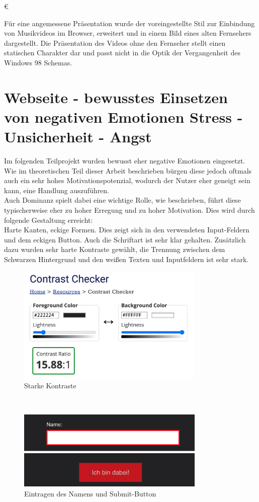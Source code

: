 €\documentclass[./dokumentation.tex]{subfiles}
\begin{document}
Für eine angemessene Präsentation wurde der voreingestellte Stil zur Einbindung von Musikvideos im Browser, erweitert und in einem Bild eines alten Fernsehers dargestellt. Die Präsentation des Videos ohne den Fernseher stellt einen statischen Charakter dar und passt nicht in die Optik der Vergangenheit des Windows 98 Schemas.


\pagebreak
\section{Webseite - bewusstes Einsetzen von negativen Emotionen Stress - Unsicherheit - Angst}
Im folgenden Teilprojekt wurden bewusst eher negative Emotionen eingesetzt. Wie im theoretischen Teil dieser Arbeit beschrieben bürgen diese jedoch oftmals auch ein sehr hohes Motivationspotenzial, wodurch der Nutzer eher geneigt sein kann, eine Handlung auszuführen.\\
Auch Dominanz spielt dabei eine wichtige Rolle, wie beschrieben, führt diese typischerweise eher zu hoher Erregung und zu hoher Motivation. Dies wird durch folgende Gestaltung erreicht:\\
Harte Kanten, eckige Formen. Dies zeigt sich in den verwendeten Input-Feldern und dem eckigen Button. Auch die Schriftart ist sehr klar gehalten. Zusätzlich dazu wurden sehr harte Kontraste gewählt, die Trennung zwischen dem Schwarzen Hintergrund und den weißen Texten und Inputfeldern ist sehr stark.

\begin{figure}[H]
    \centering
    \includegraphics[width=0.8\textwidth]{bilder/contrast.png}
    \caption{Starke Kontraste} %
    \label{fig12:contrast}
\end{figure}\\

\begin{figure}[H]
    \centering
    \includegraphics[width=0.8\textwidth]{bilder/name-bin-dabei.png}
    \caption{Eintragen des Namens und Submit-Button} %
    \label{fig13:name}
\end{figure}\\
\end{document}
